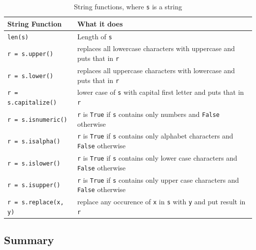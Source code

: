 \documentclass[11pt]{cselabheader}
\begin{document}
\begin{table}[!ht]
  \centering
  \begin{tabular}{ll}
    \toprule
    String Function & What it does \\
    \midrule
    \lstinline!len(s)! & Length of \lstinline!s! \\
    \lstinline!r = s.upper()! & replaces all lowercase characters with uppercase
    and puts that in \lstinline!r! \\
    \lstinline!r = s.lower()! & replaces all uppercase characters with lowercase
    and puts that in \lstinline!r! \\
    \lstinline!r = s.capitalize()! & lower case of \lstinline!s! with capital
    first letter and puts that in \lstinline!r! \\
    \lstinline!r = s.isnumeric()! & \lstinline!r! is \lstinline!True! if
    \lstinline!s! contains only numbers and \lstinline!False! otherwise\\
    \lstinline!r = s.isalpha()! & \lstinline!r! is \lstinline!True! if
    \lstinline!s! contains only alphabet characters and \lstinline!False!
    otherwise\\
    \lstinline!r = s.islower()! & \lstinline!r! is \lstinline!True! if
    \lstinline!s! contains only lower case characters and \lstinline!False!
    otherwise\\
    \lstinline!r = s.isupper()! & \lstinline!r! is \lstinline!True! if
    \lstinline!s! contains only upper case characters and \lstinline!False!
    otherwise\\
    \lstinline!r = s.replace(x, y)! & replace any occurence of \lstinline!x! in
    \lstinline!s! with \lstinline!y! and put result in \lstinline!r! \\
    \bottomrule 
  \end{tabular}
  \caption{String functions, where \lstinline!s! is a string}
  \label{tab:str}
\end{table}

\subsection{Summary}
\end{document}
